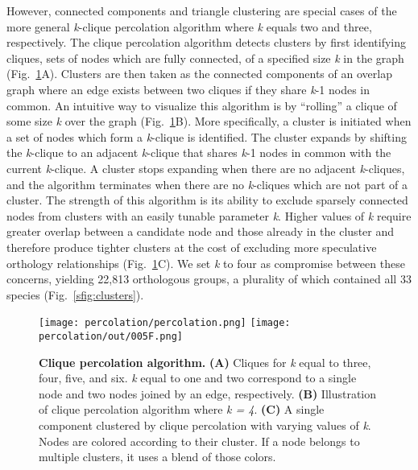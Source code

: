 However, connected components and triangle clustering are special cases of the more general \textit{k}-clique percolation algorithm where \textit{k} equals two and three, respectively. The clique percolation algorithm detects clusters by first identifying cliques, sets of nodes which are fully connected, of a specified size \textit{k} in the graph (Fig.~\ref{fig:percolation}A). Clusters are then taken as the connected components of an overlap graph where an edge exists between two cliques if they share \textit{k}-1 nodes in common. An intuitive way to visualize this algorithm is by ``rolling'' a clique of some size \textit{k} over the graph (Fig.~\ref{fig:percolation}B). More specifically, a cluster is initiated when a set of nodes which form a \textit{k}-clique is identified. The cluster expands by shifting the \textit{k}-clique to an adjacent \textit{k}-clique that shares \textit{k}-1 nodes in common with the current \textit{k}-clique. A cluster stops expanding when there are no adjacent \textit{k}-cliques, and the algorithm terminates when there are no \textit{k}-cliques which are not part of a cluster. The strength of this algorithm is its ability to exclude sparsely connected nodes from clusters with an easily tunable parameter \textit{k}. Higher values of \textit{k} require greater overlap between a candidate node and those already in the cluster and therefore produce tighter clusters at the cost of excluding more speculative orthology relationships (Fig.~\ref{fig:percolation}C). We set \textit{k} to four as compromise between these concerns, yielding 22,813 orthologous groups, a plurality of which contained all 33 species (Fig.~\ref{sfig:clusters}).

\begin{figure}[h!]
\texttt{[image: percolation/percolation.png]}
\texttt{[image: percolation/out/005F.png]}
\centering
\caption{\textbf{Clique percolation algorithm.}
\textbf{(A)} Cliques for \textit{k} equal to three, four, five, and six. \textit{k} equal to one and two correspond to a single node and two nodes joined by an edge, respectively. \textbf{(B)} Illustration of clique percolation algorithm where \textit{k = 4}. \textbf{(C)} A single component clustered by clique percolation with varying values of \textit{k}. Nodes are colored according to their cluster. If a node belongs to multiple clusters, it uses a blend of those colors.}
\label{fig:percolation}
\end{figure}

